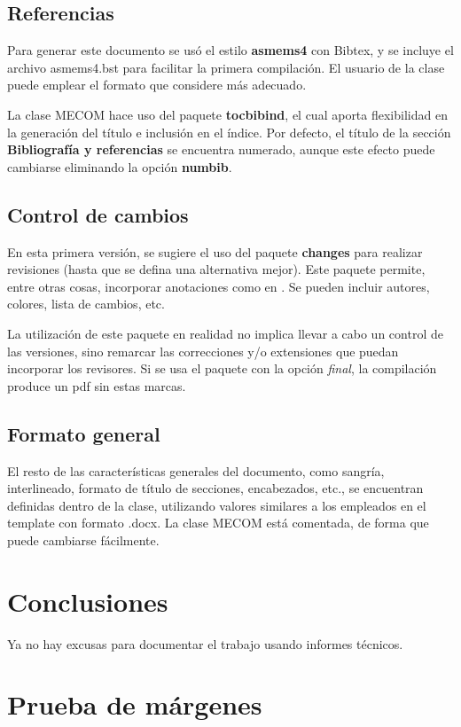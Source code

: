 \documentclass[a4paper,11pt,twoside]{MECOM}
\begin{document}
    
    \subsection{Referencias}
    Para generar este documento se us\'o el estilo {\bf asmems4} con Bibtex, y se incluye el archivo asmems4.bst para facilitar la primera compilaci\'on. El usuario de la clase puede emplear el formato que considere m\'as adecuado.
    \par
    La clase MECOM hace uso del paquete {\bf tocbibind}, el cual aporta flexibilidad en la generaci\'on del t\'itulo e inclusi\'on en el \'indice. Por defecto, el t\'itulo de la secci\'on {\bf Bibliograf\'ia y referencias} se encuentra numerado, aunque este efecto puede cambiarse eliminando la opci\'on {\bf numbib}.
    
    \subsection{Control de cambios}
    En esta primera versi\'on, se sugiere el uso del paquete {\bf changes} para realizar revisiones (hasta que se defina una alternativa mejor). Este paquete permite, entre otras cosas, incorporar anotaciones como en . Se pueden incluir autores, colores, lista de cambios, etc.
    \par
    La utilizaci\'on de este paquete en realidad no implica llevar a cabo un control de las versiones, sino remarcar las correcciones y/o extensiones que puedan incorporar los revisores. Si se usa el paquete con la opci\'on \emph{final}, la compilaci\'on produce un pdf sin estas marcas.
    
    \subsection{Formato general}
    El resto de las caracter\'isticas generales del documento, como sangr\'ia, interlineado, formato de t\'itulo de secciones, encabezados, etc., se encuentran definidas dentro de la clase, utilizando valores similares a los empleados en el template con formato .docx. La clase MECOM est\'a comentada, de forma que puede cambiarse f\'acilmente.
    
    
    \section{Conclusiones}
    Ya no hay excusas para documentar el trabajo usando informes t\'ecnicos.\\    
    
    
    
    
    
    
    \newpage
    \section{Prueba de m\'argenes} \blindtext[11]    
\end{document}
